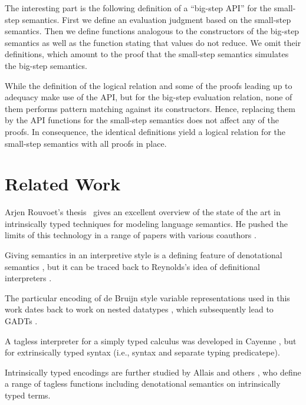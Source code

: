 \documentclass[acmsmall,anonymous,review,screen]{acmart}
\begin{document}
The interesting part is the following definition of a ``big-step API'' for the small-step semantics.
First we define an evaluation judgment based on the small-step semantics.
\SmallStepBigAPI
Then we define functions analogous to the constructors of the big-step semantics as well as the function stating that values do not reduce.
\SmallStepBigAPIFunctions
We omit their definitions, which amount to the proof that the small-step semantics simulates the big-step semantics.

While the definition of the logical relation and some of the proofs leading up to adequacy make use of the API, but for the big-step evaluation relation, none of them performs pattern matching against its constructors. Hence, replacing them by the API functions for the small-step semantics does not affect any of the proofs.
In consequence, the identical definitions yield a logical relation for
the small-step semantics with all proofs in place.


\section{Related Work}
\label{sec:related-work}

Arjen Rouvoet's thesis~\cite{DBLP:phd/basesearch/Rouvoet21} gives an
excellent overview of the state of the art in intrinsically typed
techniques for modeling language semantics. He pushed the limits of
this technology in a range of papers with various coauthors
\cite{DBLP:journals/pacmpl/RestPRVM22,DBLP:journals/pacmpl/RouvoetKV21,DBLP:conf/cpp/RouvoetPKV20,DBLP:journals/pacmpl/PoulsenRTKV18}. 

Giving semantics in an interpretive style is a defining feature of
denotational semantics \cite{Schmidt1986}, but it can be traced back
to Reynolds's idea of definitional interpreters \cite{Reynolds1975}.

The particular encoding of de Bruijn style variable representations
used in this work dates back to work on nested datatypes
\cite{DBLP:conf/mpc/BirdM98,DBLP:journals/jfp/BirdP99,DBLP:conf/csl/AltenkirchR99},
which subsequently lead to GADTs
\cite{cheney03:_first_class_phant_types}.

A tagless interpreter for a simply typed calculus was developed in
Cayenne \cite{augustsson99}, but for extrinsically typed syntax (i.e.,
syntax and separate typing predicatepe).

Intrinsically typed encodings are further studied by Allais and others
\cite{DBLP:conf/cpp/Allais0MM17}, who define a range of tagless
functions including denotational semantics on intrinsically typed
terms. 
\end{document}
